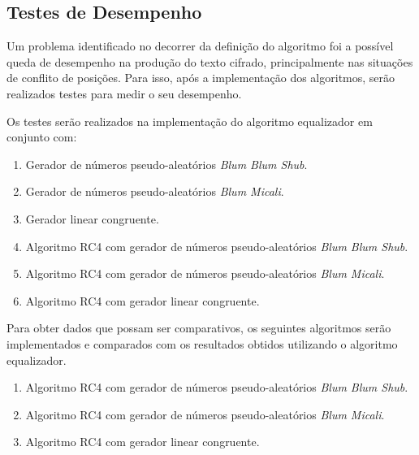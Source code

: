 	\subsection{Testes de Desempenho}
	\label{tests}
	
	Um problema identificado no decorrer da definição do algoritmo foi a possível queda de desempenho na produção do texto cifrado, principalmente nas situações de conflito de posições. Para isso, após a implementação dos algoritmos, serão realizados testes para medir o seu desempenho.

	Os testes serão realizados na implementação do algoritmo equalizador em conjunto com:
	\begin{enumerate}
		\item Gerador de números pseudo-aleatórios \textit{Blum Blum Shub}.
		\item Gerador de números pseudo-aleatórios \textit{Blum Micali}.
		\item Gerador linear congruente. 
		\item Algoritmo RC4 com gerador de números pseudo-aleatórios \textit{Blum Blum Shub}.
		\item Algoritmo RC4 com gerador de números pseudo-aleatórios \textit{Blum Micali}.
		\item Algoritmo RC4 com gerador linear congruente.
	\end{enumerate}
	
	Para obter dados que possam ser comparativos, os seguintes algoritmos serão implementados e comparados com os resultados obtidos utilizando o algoritmo equalizador.
	
	\begin{enumerate}
		\item Algoritmo RC4 com gerador de números pseudo-aleatórios \textit{Blum Blum Shub}.
		\item Algoritmo RC4 com gerador de números pseudo-aleatórios \textit{Blum Micali}.
		\item Algoritmo RC4 com gerador linear congruente.
	\end{enumerate}

	
	
